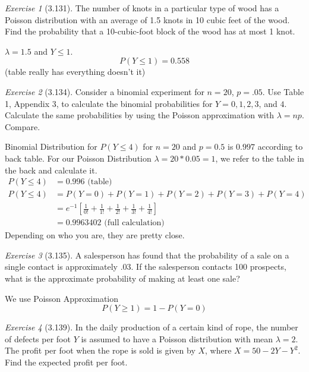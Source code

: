 \documentclass[12pt]{amsart}
\makeatletter
\theoremstyle{remark}
\newtheorem*{exercise}{Exercise}%
\renewenvironment{proof}[1][\proofname]{\par\doublespacing
  \pushQED{\qed}%
  \normalfont \topsep6\p@\@plus6\p@\relax
  \list{}{%
    \settowidth{\leftmargin}{\itshape\proofname:\hskip\labelsep}%
    \setlength{\labelwidth}{0pt}%
    \setlength{\itemindent}{-\leftmargin}%
  }%
  \item[\hskip\labelsep\itshape#1\@addpunct{:}]\ignorespaces
}{%
  \popQED\endlist\@endpefalse
  \singlespacing
}
\theoremstyle{mycomment}
\makeatother
\begin{document}
\begin{exercise}[3.131]
The number of knots in a particular type of wood has a Poisson distribution with an average of 1.5 knots in 10 cubic feet of the wood. Find the probability that a 10-cubic-foot block of the wood has at most 1 knot.

\begin{proof}[Solution]
	$\lambda = 1.5$ and $Y \leq 1$.
	$$P(Y \leq 1) = 0.558 $$
	(table really has everything doesn't it) 
\end{proof}
\end{exercise}

\begin{exercise}[3.134]
Consider a binomial experiment for $n = 20$, $p = .05$. Use Table 1, Appendix 3, to calculate the binomial probabilities for $Y = 0, 1, 2, 3$, and $4$. Calculate the same probabilities by using the Poisson approximation with $\lambda = np$. Compare.

\begin{proof}[Solution]
	Binomial Distribution for $P(Y \leq 4)$ for $n = 20$ and $p = 0.5$ is $0.997$ according to back table. For 
	our Poisson Distribution $\lambda = 20*0.05 = 1$, we refer to the table in the back and calculate it.
	\begin{align*}
		P(Y \leq 4) &= 0.996 \text{ (table)} \\
		P(Y \leq 4) &= P(Y = 0) + P(Y = 1) + P(Y = 2) + P(Y=3) + P(Y = 4) \\
			&= e^{-1}[\frac{1}{0!} + \frac{1}{1!} + \frac{1}{2!}+ \frac{1}{3!}+ \frac{1}{4!}] \\
			&= 0.9963402 \text{ (full calculation)}
	\end{align*}
	Depending on who you are, they are pretty close.
\end{proof}
\end{exercise}

\begin{exercise}[3.135]
A salesperson has found that the probability of a sale on a single contact is approximately .03. If the salesperson contacts 100 prospects, what is the approximate probability of making at least one sale?

\begin{proof}[Solution]
We use Poisson Approximation
	$$P(Y \geq 1) = 1 - P(Y = 0)$$
\end{proof}
\end{exercise}

\begin{exercise}[3.139]
In the daily production of a certain kind of rope, the number of defects per foot $Y$ is assumed to have a Poisson distribution with mean $\lambda = 2$. The profit per foot when the rope is sold is given by $X$, where $X = 50 - 2Y - Y^2$. Find the expected profit per foot.

\begin{proof}[Solution]
 
\end{proof}
\end{exercise}
\end{document}
